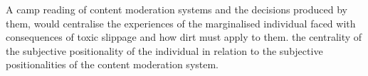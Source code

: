 A camp reading of content moderation systems and the decisions produced by them, would centralise the experiences of the marginalised individual faced with consequences of toxic slippage and how dirt must apply to them.
 the centrality of the subjective positionality of the individual in relation to the subjective positionalities of the content moderation system.

%
%
%
